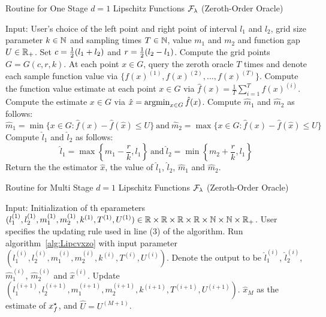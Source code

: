 \newcommand{\lei}{_-}
\newcommand{\rii}{_+}
\begin{algorithm}[htp]
\caption{Routine for One Stage $d = 1$ Lipschitz Functions 
	$\mathcal{F}_\lambda$ (Zeroth-Order Oracle)}  %
\begin{algorithmic}[1]  %
\Statex Input:  User's choice of the left point and right point of interval $l_1$ and 
	$l_2$,  grid size parameter $k\in \mathbb{N}$ and sampling times $T\in \mathbb{N}$, 
	value $m_1$ and $m_2$ and function gap ${U} \in \mathbb{R}_+$.
\State Set $c = \frac{1}{2}(l_1 + l_2)$ and $r = \frac{1}{2}(l_2 - l_1)$. Compute the grid points $G = G(c, r, k)$.
\State At each point $x \in G$, query the zeroth oracle $T$ times and denote each sample 
	function value via $\{f(x)^{(1)}, f(x)^{(2)}, \ldots, f(x)^{(T)}\}$.
\State Compute the function value estimate at each point $x \in G$ via $
		\hat{f}(x) = \frac{1}{T} \sum_{i=1}^T f(x)^{(i)}$. 
\State Compute the estimate $x \in G$ via 
		$\hat{x} = \argmin_{x\in G} \hat{f}(x)$.
\State Compute $\hat{m}_1$ and $\hat{m}_2$ as follows: 
	\begin{equation*}
		\hat{m}_1= \min\{x \in G: \hat{f}(x) -  \hat{f}(\hat{x}) \leq U\}~\text{and}~
		\hat{m}_2 = \max\{x \in G: \hat{f}(x) - \hat{f}(\hat{x}) \leq U\}
	\end{equation*}
\State Compute $\hat{l}_1$ and $\hat{l}_2$ as follows: 
	\begin{equation*}
	\hat{l}_1 = \max \left\{m_1 - \frac{r}{k}, l_1 \right\}~\text{and}~
	\hat{l}_2 = \min \left\{m_2 + \frac{r}{k}, l_1 \right\}	
	\end{equation*}
\State Return the the estimator $\hat{x}$, the value of $\hat{l}_1$, $\hat{l}_2$,
	$\hat{m}_1$ and $\hat{m}_2$.
\end{algorithmic}
\label{alg:Lipcvxzo}
\end{algorithm}

\begin{algorithm}[htp]
\caption{Routine for Multi Stage $d = 1$ Lipschitz Functions 
	$\mathcal{F}_\lambda$ (Zeroth-Order Oracle)}  %
\begin{algorithmic}[1]  %
\Statex Input:  Initialization of th eparameters $(l_1^{(1)}, l_2^{(1)}, m_1^{(1)}, 
	m_2^{(1)}, k^{(1)}, T^{(1)}, U^{(1)}) \in \mathbb{R} \times \mathbb{R} \times \mathbb{R} \times \mathbb{R} 
		 \times \mathbb{N} \times \mathbb{N} \times \mathbb{R}_+$.
	User specifies the updating rule used in line (3) of the algorithm. 
	\State Run algorithm~\ref{alg:Lipcvxzo} with input parameter $(l_1^{(i)}, l_2^{(i)}, 
		m_1^{(i)}, m_2^{(i)}, k^{(i)}, T^{(i)}, U^{(i)})$. Denote the output to be 
		$\hat{l}_1^{(i)}$, $\hat{l}_2^{(i)}$, $\hat{m}_1^{(i)}$, $\hat{m}_2^{(i)}$
		and $\hat{x}^{(i)}$.
	\State Update $(l_1^{(i+1)}, l_2^{(i+1)}, 
		m_1^{(i+1)}, m_2^{(i+1)}, k^{(i+1)}, T^{(i+1)}, U^{(i+1)})$.
\ENDFOR
\State \Return $\hat{x}_M$ as the estimate of $x_f^\star$, and $\hat{U} = U^{(M+1)}$.
\end{algorithmic}
\label{alg:Lipcvxzo-r-round}
\end{algorithm}

